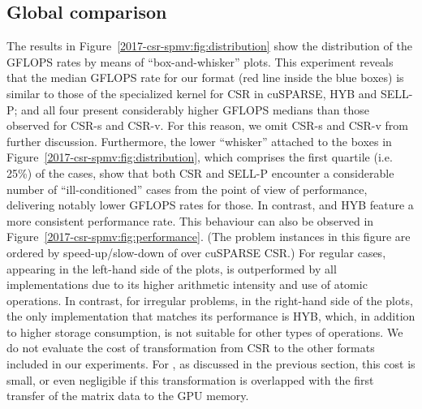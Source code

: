 \subsection{Global comparison}

The results in Figure~\ref{2017-csr-spmv:fig:distribution}
show the distribution of the GFLOPS rates
by means of ``box-and-whisker'' plots.
This experiment reveals that
the median GFLOPS rate for our \bcsr format
(red line inside the blue boxes) is similar 
to those of the specialized kernel for CSR in cuSPARSE, HYB and SELL-P;
and all four present considerably higher
GFLOPS medians than those observed for CSR-s and CSR-v.
For this reason, we omit CSR-s and CSR-v from further discussion.
Furthermore, the lower ``whisker'' attached to the boxes in
Figure~\ref{2017-csr-spmv:fig:distribution},
which comprises the first quartile (i.e. 25\%) of the cases,
show that both CSR and SELL-P encounter a
considerable number of ``ill-conditioned'' cases
from the point of view of performance,
delivering notably lower GFLOPS rates for those.
In contrast, \bcsr and HYB feature a more consistent performance rate.
This behaviour can also be observed in Figure~\ref{2017-csr-spmv:fig:performance}.
(The problem instances in this figure are ordered
by speed-up/slow-down of \bcsr over cuSPARSE CSR.)
For regular cases, appearing in the left-hand side of the plots, \bcsr is outperformed
by all implementations due to its higher arithmetic intensity
and use of atomic operations.
In contrast, for irregular problems, in the right-hand side of the plots,
the only implementation that matches its performance is HYB,
which, in addition to higher storage consumption,
is not suitable for other types of operations.
We do not evaluate the cost of transformation
from CSR to the other formats included in our experiments.
For \bcsr, as discussed in the previous section, this cost is small,
or even negligible if this transformation is overlapped
with the first transfer of the matrix data to the GPU memory.

